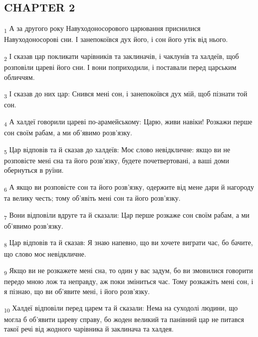 \subsection{CHAPTER 2}
\begin{tcolorbox}
\textsubscript{1} А за другого року Навуходоносорового царювання приснилися Навуходоносорові сни. І занепокоївся дух його, і сон його утік від нього.
\end{tcolorbox}
\begin{tcolorbox}
\textsubscript{2} І сказав цар покликати чарівників та заклиначів, і чаклунів та халдеїв, щоб розповіли цареві його сни. І вони поприходили, і поставали перед царським обличчям.
\end{tcolorbox}
\begin{tcolorbox}
\textsubscript{3} І сказав до них цар: Снився мені сон, і занепокоївся дух мій, щоб пізнати той сон.
\end{tcolorbox}
\begin{tcolorbox}
\textsubscript{4} А халдеї говорили цареві по-арамейському: Царю, живи навіки! Розкажи перше сон своїм рабам, а ми об'явимо розв'язку.
\end{tcolorbox}
\begin{tcolorbox}
\textsubscript{5} Цар відповів та й сказав до халдеїв: Моє слово невідкличне: якщо ви не розповісте мені сна та його розв'язку, будете почетвертовані, а ваші доми обернуться в руїни.
\end{tcolorbox}
\begin{tcolorbox}
\textsubscript{6} А якщо ви розповісте сон та його розв'язку, одержите від мене дари й нагороду та велику честь; тому об'явіть мені сон та його розв'язку.
\end{tcolorbox}
\begin{tcolorbox}
\textsubscript{7} Вони відповіли вдруге та й сказали: Цар перше розкаже сон своїм рабам, а ми об'явимо розв'язку.
\end{tcolorbox}
\begin{tcolorbox}
\textsubscript{8} Цар відповів та й сказав: Я знаю напевно, що ви хочете виграти час, бо бачите, що слово моє невідкличне.
\end{tcolorbox}
\begin{tcolorbox}
\textsubscript{9} Якщо ви не розкажете мені сна, то один у вас задум, бо ви змовилися говорити передо мною лож та неправду, аж поки зміниться час. Тому розкажіть мені сон, і я пізнаю, що ви об'явите мені, і його розв'язку.
\end{tcolorbox}
\begin{tcolorbox}
\textsubscript{10} Халдеї відповіли перед царем та й сказали: Нема на суходолі людини, що могла б об'явити цареву справу, бо жоден великий та панівний цар не питався такої речі від жодного чарівника й заклинача та халдея.
\end{tcolorbox}
